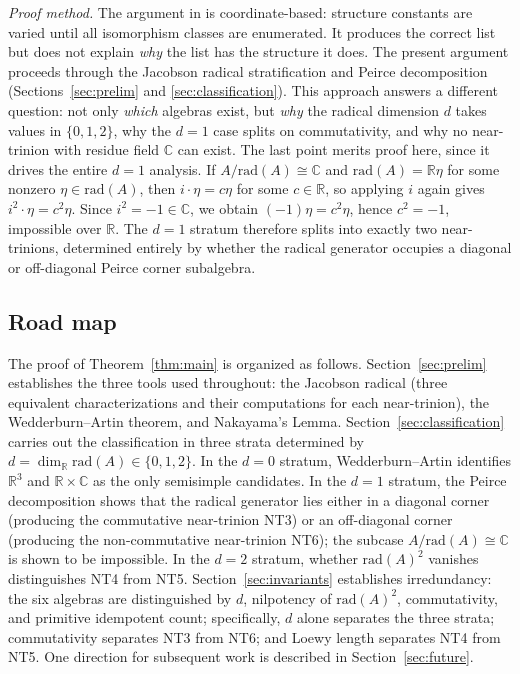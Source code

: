 \documentclass{amsart}
\theoremstyle{plain}
\theoremstyle{definition}
\theoremstyle{remark}
\newcommand{\RR}{\mathbb{R}}
\newcommand{\CC}{\mathbb{C}}
\newcommand{\Jac}{\mathrm{rad}}
\begin{document}
\emph{Proof method.}
The argument in \cite{Kobayashi2021} is coordinate-based: structure
constants are varied until all isomorphism classes are enumerated.
It produces the correct list but does not explain \emph{why} the list
has the structure it does.
The present argument proceeds through the Jacobson radical stratification
and Peirce decomposition (Sections~\ref{sec:prelim} and
\ref{sec:classification}).
This approach answers a different question: not only \emph{which} algebras
exist, but \emph{why} the radical dimension $d$ takes values in $\{0,1,2\}$,
why the $d=1$ case splits on commutativity, and why no near-trinion with
residue field $\CC$ can exist.
The last point merits proof here, since it drives the entire $d=1$ analysis. If $A/ \Jac(A)\cong\CC$ and $\Jac(A)=\RR\eta$ for some nonzero $\eta\in\Jac(A)$, then $i\cdot\eta=c\eta$ for some $c\in\RR$,
so applying $i$ again gives $i^2\cdot\eta = c^2\eta$. Since $i^2=-1 \in \CC$, we obtain
$(-1)\eta = c^2\eta$, hence $c^2=-1$, impossible over $\RR$.
The $d=1$ stratum therefore splits into exactly two near-trinions, determined
entirely by whether the radical generator occupies a diagonal or off-diagonal
Peirce corner subalgebra. 

\subsection{Road map}

The proof of Theorem~\ref{thm:main} is organized as follows.
Section~\ref{sec:prelim} establishes the three tools used throughout:
the Jacobson radical (three equivalent characterizations and their
computations for each near-trinion), the Wedderburn--Artin theorem,
and Nakayama's Lemma.
Section~\ref{sec:classification} carries out the classification in three
strata determined by $d = \dim_\RR \Jac(A) \in \{0,1,2\}$.
In the $d = 0$ stratum, Wedderburn--Artin identifies $\RR^3$ and
$\RR\times\CC$ as the only semisimple candidates.
In the $d = 1$ stratum, the Peirce decomposition shows that the radical
generator lies either in a diagonal corner (producing the commutative
near-trinion NT3) or an off-diagonal corner (producing the non-commutative
near-trinion NT6); the subcase $A/\Jac(A) \cong \CC$ is shown to be
impossible.
In the $d = 2$ stratum, whether $\Jac(A)^2$ vanishes distinguishes
NT4 from NT5.
Section~\ref{sec:invariants} establishes irredundancy: the six algebras
are distinguished by $d$, nilpotency of $\Jac(A)^2$, commutativity,
and primitive idempotent count; specifically, $d$ alone separates the
three strata; commutativity separates NT3 from NT6; and Loewy length
separates NT4 from NT5. One direction for subsequent work is described in
Section~\ref{sec:future}.
\end{document}
